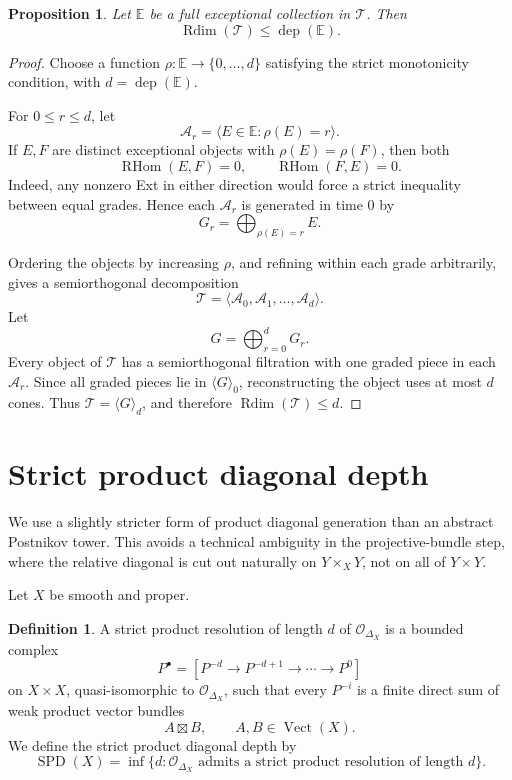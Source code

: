 \documentclass[11pt]{amsart}
\numberwithin{equation}{section}
\newtheorem{proposition}[theorem]{Proposition}
\theoremstyle{definition}
\newtheorem{definition}[theorem]{Definition}
\DeclareMathOperator{\Rdim}{Rdim}
\DeclareMathOperator{\RHom}{RHom}
\DeclareMathOperator{\SPD}{SPD}
\DeclareMathOperator{\dep}{dep}
\begin{document}
\begin{proposition}
Let $\mathbb E$ be a full exceptional collection in $\mathcal T$. Then
\[
\Rdim(\mathcal T)\le \dep(\mathbb E).
\]
\end{proposition}

\begin{proof}
Choose a function $\rho:\mathbb E\to\{0,\dots,d\}$ satisfying the strict monotonicity condition, with $d=\dep(\mathbb E)$.

For $0\le r\le d$, let
\[
\mathcal A_r=\langle E\in\mathbb E:\rho(E)=r\rangle.
\]
If $E,F$ are distinct exceptional objects with $\rho(E)=\rho(F)$, then both
\[
\RHom(E,F)=0,
\qquad
\RHom(F,E)=0.
\]
Indeed, any nonzero Ext in either direction would force a strict inequality between equal grades. Hence each $\mathcal A_r$ is generated in time $0$ by
\[
G_r=\bigoplus_{\rho(E)=r}E.
\]

Ordering the objects by increasing $\rho$, and refining within each grade arbitrarily, gives a semiorthogonal decomposition
\[
\mathcal T=
\langle
\mathcal A_0,\mathcal A_1,\dots,\mathcal A_d
\rangle.
\]
Let
\[
G=\bigoplus_{r=0}^dG_r.
\]
Every object of $\mathcal T$ has a semiorthogonal filtration with one graded piece in each $\mathcal A_r$. Since all graded pieces lie in $\langle G\rangle_0$, reconstructing the object uses at most $d$ cones. Thus $\mathcal T=\langle G\rangle_d$, and therefore $\Rdim(\mathcal T)\le d$.
\end{proof}

\section{Strict product diagonal depth}

We use a slightly stricter form of product diagonal generation than an abstract Postnikov tower. This avoids a technical ambiguity in the projective-bundle step, where the relative diagonal is cut out naturally on $Y\times_XY$, not on all of $Y\times Y$.

Let $X$ be smooth and proper.

\begin{definition}
A strict product resolution of length $d$ of $\mathcal O_{\Delta_X}$ is a bounded complex
\[
P^\bullet=
\left[
P^{-d}\to P^{-d+1}\to\cdots\to P^0
\right]
\]
on $X\times X$, quasi-isomorphic to $\mathcal O_{\Delta_X}$, such that every $P^{-i}$ is a finite direct sum of weak product vector bundles
\[
A\boxtimes B,
\qquad
A,B\in \operatorname{Vect}(X).
\]
We define the strict product diagonal depth by
\[
\SPD(X)=
\inf\{d:\mathcal O_{\Delta_X}\text{ admits a strict product resolution of length }d\}.
\]
\end{definition}
\end{document}
